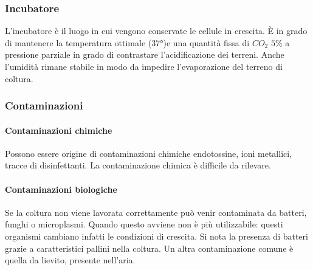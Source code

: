		\subsubsection{Incubatore}
		L'incubatore \`e il luogo in cui vengono conservate le cellule in crescita.
		\`E in grado di mantenere la temperatura ottimale ($37\si{\degree}$)e una quantit\`a fissa di \emph{$CO_2$} $5\%$ a pressione parziale in grado di contrastare l'acidificazione dei terreni.
		Anche l'umidit\`a rimane stabile in modo da impedire l'evaporazione del terreno di coltura.

		\subsubsection{Contaminazioni}

			\paragraph{Contaminazioni chimiche}
			Possono essere origine di contaminazioni chimiche endotossine, ioni metallici, tracce di disinfettanti.
			La contaminazione chimica \`e difficile da rilevare.

			\paragraph{Contaminazioni biologiche}
			Se la coltura non viene lavorata correttamente pu\`o venir contaminata da batteri, funghi o microplasmi.
			Quando questo avviene non \`e pi\`u utilizzabile: questi organismi cambiano infatti le condizioni di crescita.
			Si nota la presenza di batteri grazie a caratteristici pallini nella coltura.
			Un altra contaminazione comune \`e quella da lievito, presente nell'aria.


